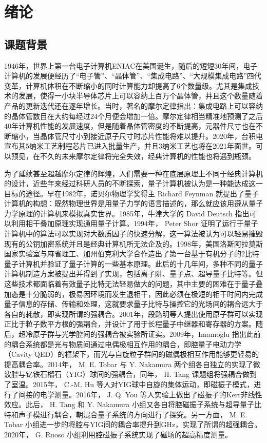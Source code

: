 
\chapter{绪论}
\label{ch1}

\section{课题背景}
1946年，世界上第一台电子计算机ENIAC在美国诞生，随后的短短30年间，电子计算机的发展便经历了“电子管”、“晶体管”、“集成电路”、“大规模集成电路”四代变革，计算机体积在不断缩小的同时计算能力却提高了6个数量级。尤其是集成技术的发展，使得一小块半导体芯片上可以容纳上百万个晶体管，并且这个数量随着产品的更新迭代还在逐年增长。当时，著名的摩尔定律指出：集成电路上可以容纳的晶体管数目在大约每经过24个月便会增加一倍。摩尔定律相当精准地预测了之后40年计算机性能的发展速度，但是随着晶体管密度的不断提高，元器件尺寸也在不断缩小，当晶体管尺寸小到接近原子尺寸时芯片性能将难以提升。2020年，台积电宣布其5纳米工艺制程芯片已进入批量生产，并且3纳米工艺也将在2021年面世。可以预见，在不久的未来摩尔定律将完全失效，经典计算机的性能也将遇到瓶颈。

为了延续甚至超越摩尔定律的辉煌，人们需要一种在底层原理上不同于经典计算机的设计，近些年来经过科研人员的不断探索，量子计算机被认为是一种能达成这一目标的途径。早在1982年，诺贝尔物理学奖得主 Richard Feynman 就提出了量子计算机的构想：既然物理世界是用量子力学的语言描述的，那么就应该用遵从量子力学原理的计算机来模拟真实世界。1985年，牛津大学的 David Deutsch 指出可以利用相干叠加原理实现通用量子计算。1994年， Peter Shor 证明了运行于量子计算机中的算法可以实现对大数质因子的快速分解，这一算法被认为可以轻易摧毁现有的公钥加密系统并且是经典计算机所无法企及的。1998年，美国洛斯阿拉莫斯国家实验室与麻省理工、加州伯克利大学合作造出了第一台基于有机分子的2比特量子计算机并验证了量子计算的一些基本原理。此后的十几年间，多种不同的量子计算机制造方案被提出并得到了实现，包括离子阱、量子点、超导量子比特等。但这些技术都面临着有效量子比特无法轻易做大的问题，其中主要的困难在于量子叠加态是十分脆弱的，极易因环境而发生退相干，因此必须在极短的相干时间内完成量子信息的存储、传输和处理，这就要求量子比特与操控它的光场间的耦合远大于各自的耗散，即实现所谓的强耦合。2001年，段路明等人提出使用原子群可以实现正比于粒子数平方根的强耦合，并设计了用于长程量子中继器和寄存器的方案。随后，超冷原子群与光学腔间的强耦合被实验所证实。2009年，Imamo\u{g}lu 指出此前的耦合系统都是光与物质间通过电偶极相互作用的耦合，即腔量子电动力学（Cavity QED）的框架下，而光与自旋粒子群间的磁偶极相互作用能够更轻易的提高耦合率。2014年， M. E. Tobar 与 Y. Nakamura 两个组各自独立的实现了微波腔与钇铁石榴石（YIG）球间的强耦合，同年， H. Tang 课题组将强耦合做到了室温。2015年， C.-M. Hu 等人对YIG球中自旋的集体运动，即磁振子模式，进行了间接的电学测量。2016年， J. Q. You 等人实验上做出了磁振子的Kerr非线性效应。此后， H. Tang 和 Y. Nakamura 小组又各自将腔磁振子系统与超导量子比特和声子模进行耦合，朝混合量子系统的方向进行了探究。另一方面， M. E. Tobar 小组进一步的将腔与YIG间的耦合率提升到GHz，实现了所谓的超强耦合。2020年， G. Ruoso 小组利用腔磁振子系统实现了磁场的超高精度测量。

